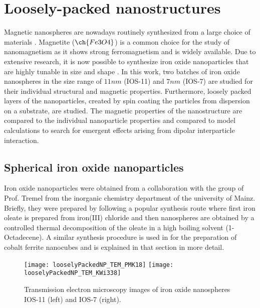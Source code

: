 \documentclass[\main/dresen_thesis.tex]{subfiles}
\begin{document}
\chapter{Loosely-packed nanostructures}\label{ch:looselyPackedNS}
Magnetic nanospheres are nowadays routinely synthesized from a large choice of materials \cite{Gubin_2005_Magne}.
Magnetite ($\ch{Fe3O4}$) is a common choice for the study of nanomagnetism as it shows strong ferromagnetism and is widely available.
Due to extensive research, it is now possible to synthesize iron oxide nanoparticles that are highly tunable in size and shape \cite{Wetterskog_2014_Preci}.
In this work, two batches of iron oxide nanospheres in the size range of $11 \unit{nm}$ (IOS-11) and $7 \unit{nm}$ (IOS-7) are studied for their individual structural and magnetic properties.
Furthermore, loosely packed layers of the nanoparticles, created by spin coating the particles from dispersion on a substrate, are studied.
The magnetic properties of the nanostructure are compared to the individual nanoparticle properties and compared to model calculations to search for emergent effects arising from dipolar interparticle interaction.

\section{Spherical iron oxide nanoparticles}
Iron oxide nanoparticles were obtained from a collaboration with the group of Prof. Tremel from the inorganic chemistry department of the university of Mainz.
Briefly, they were prepared by following a popular synthesis route where first iron oleate is prepared from iron(III) chloride and then nanospheres are obtained by a controlled thermal decomposition of the oleate in a high boiling solvent (1-Octadecene).
A similar synthesis procedure is used in  for the preparation of cobalt ferrite nanocubes and is explained in that section in more detail.

\begin{figure}[tb]
  \centering
  \texttt{[image: looselyPackedNP\_TEM\_PMK18]}
  \texttt{[image: looselyPackedNP\_TEM\_KWi338]}
  \caption{\label{fig:looselyPackedNP:nanoparticle:tem}Transmission electron microscopy images of iron oxide nanospheres IOS-11 (left) and IOS-7 (right).}
\end{figure}
\end{document}
